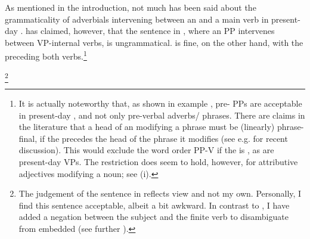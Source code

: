\documentclass[output=paper, colorlinks, citecolor=brown]{langscibook}
\begin{document}
As mentioned in the introduction, not much has been said about the grammaticality of adverbials intervening between an  and a main verb in present-day . \citet[157]{Petzell2011} has claimed, however, that the sentence in , where an  PP intervenes between VP-internal verbs, is ungrammatical.  is fine, on the other hand, with the  preceding both verbs.\footnote{It is actually noteworthy that, as shown in example , pre- PPs are acceptable in present-day , and not only pre-verbal adverbs\slash {} phrases. There are claims in the literature that a head of an  modifying a  phrase must be (linearly) phrase-final, if the  precedes the head of the phrase it modifies (see e.g. \citet{Haider_left-left_nodate} for recent discussion). This would exclude the word order PP-V if the  is , as are present-day  VPs. The restriction does seem to hold, however, for attributive adjectives modifying a noun; see (i). 
\z}

\ea {}\footnote{The judgement of the sentence in  reflects  view and not my own. Personally, I find this sentence acceptable, albeit a bit awkward. In contrast to \citet[157]{Petzell2011}, I have added a negation between the subject and the finite verb to disambiguate from embedded  (see further ).}
\label{ex:sangfelt:15}

\z 
\z 
\end{document}
